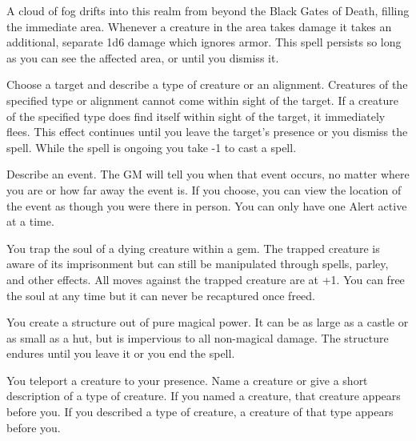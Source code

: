 A cloud of fog drifts into this realm from beyond the Black Gates of Death, filling the immediate area. Whenever a creature in the area takes damage it takes an additional, separate 1d6 damage which ignores armor. This spell persists so long as you can see the affected area, or until you dismiss it.



Choose a target and describe a type of creature or an alignment. Creatures of the specified type or alignment cannot come within sight of the target. If a creature of the specified type does find itself within sight of the target, it immediately flees. This effect continues until you leave the target's presence or you dismiss the spell. While the spell is ongoing you take -1 to cast a spell.



Describe an event. The GM will tell you when that event occurs, no matter where you are or how far away the event is. If you choose, you can view the location of the event as though you were there in person. You can only have one Alert active at a time.

\newpage
{}


You trap the soul of a dying creature within a gem. The trapped creature is aware of its imprisonment but can still be manipulated through spells, parley, and other effects. All moves against the trapped creature are at +1. You can free the soul at any time but it can never be recaptured once freed.



You create a structure out of pure magical power. It can be as large as a castle or as small as a hut, but is impervious to all non-magical damage. The structure endures until you leave it or you end the spell.



You teleport a creature to your presence. Name a creature or give a short description of a type of creature. If you named a creature, that creature appears before you. If you described a type of creature, a creature of that type appears before you.

